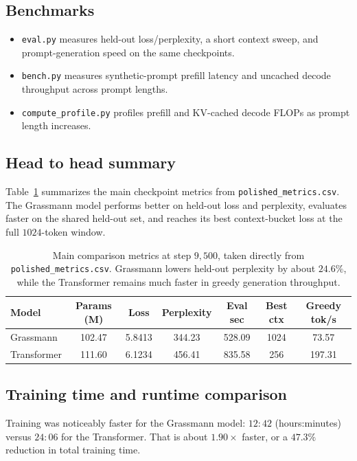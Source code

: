 \documentclass{article}
\begin{document}
\subsection{Benchmarks}
\begin{itemize}
    \item \texttt{eval.py} measures held-out loss/perplexity, a short context sweep, and prompt-generation speed on the same checkpoints.
    \item \texttt{bench.py} measures synthetic-prompt prefill latency and uncached decode throughput across prompt lengths.
    \item \texttt{compute\_profile.py} profiles prefill and KV-cached decode FLOPs as prompt length increases.
\end{itemize}

\subsection{Head to head summary}
Table~\ref{tab:heldout} summarizes the main checkpoint metrics from \texttt{polished\_metrics.csv}. The Grassmann model performs better on held-out loss and perplexity, evaluates faster on the shared held-out set, and reaches its best context-bucket loss at the full \(1024\)-token window.

\begin{table}[ht]
\centering
\small
\caption{Main comparison metrics at step \(9{,}500\), taken directly from \texttt{polished\_metrics.csv}. Grassmann lowers held-out perplexity by about \(24.6\%\), while the Transformer remains much faster in greedy generation throughput.}
\begin{tabular}{lcccccc}
\toprule
Model & Params (M) & Loss & Perplexity & Eval sec & Best ctx & Greedy tok/s \\
\midrule
Grassmann & 102.47 & 5.8413 & 344.23 & 528.09 & 1024 & 73.57 \\
Transformer & 111.60 & 6.1234 & 456.41 & 835.58 & 256 & 197.31 \\
\bottomrule
\end{tabular}
\label{tab:heldout}
\end{table}

\subsection{Training time and runtime comparison}
Training was noticeably faster for the Grassmann model: \(12{:}42\) (hours:minutes) versus \(24{:}06\) for the Transformer. That is about \(1.90\times\) faster, or a \(47.3\%\) reduction in total training time.
\end{document}
